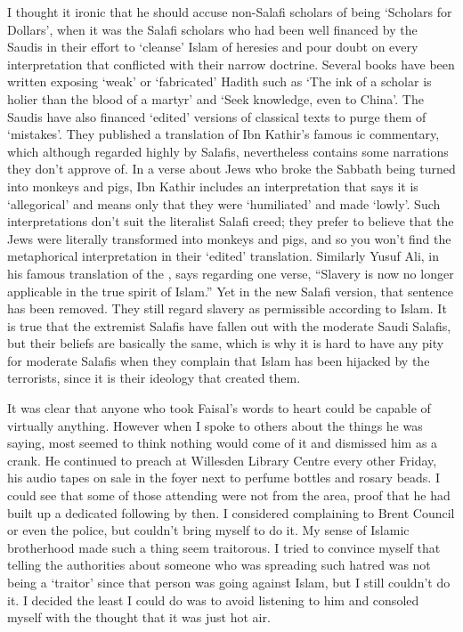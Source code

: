 \documentclass[12pt]{memoir}
\begin{document}
I thought it ironic that he should accuse non-Salafi scholars of being
‘Scholars for Dollars’, when it was the Salafi scholars
who had been well financed by the Saudis in their effort
to ‘cleanse’ Islam of heresies and pour doubt on every interpretation
that conflicted with their narrow doctrine.
Several books have been written exposing ‘weak’ or ‘fabricated’ Hadith
such as ‘The ink of a scholar is holier than the blood of a martyr’
and ‘Seek knowledge, even to China’.
The Saudis have also financed ‘edited’ versions of classical texts
to purge them of ‘mistakes’.
They published a translation of Ibn Kathir’s famous \Quran{}ic commentary,
which although regarded highly by Salafis,
nevertheless contains some narrations they don’t approve of.
In a verse about Jews who broke the Sabbath being turned into monkeys and pigs,
Ibn Kathir includes an interpretation that says it is ‘allegorical’
and means only that they were ‘humiliated’ and made ‘lowly’.
Such interpretations don’t suit the literalist Salafi creed;
they prefer to believe that the Jews were literally transformed
into monkeys and pigs, and so you won’t find
the metaphorical interpretation in their ‘edited’ translation.
Similarly Yusuf Ali, in his famous translation of the \Quran,
says regarding one verse,
“Slavery is now no longer applicable in the true spirit of Islam.”
Yet in the new Salafi version, that sentence has been removed.
They still regard slavery as permissible according to Islam.
It is true that the extremist Salafis have fallen out
with the moderate Saudi Salafis,
but their beliefs are basically the same,
which is why it is hard to have any pity for moderate Salafis
when they complain that Islam has been hijacked by the terrorists,
since it is their ideology that created them.

It was clear that anyone who took Faisal’s words to heart
could be capable of virtually anything.
However when I spoke to others about the things he was saying,
most seemed to think nothing would come of it and dismissed him as a crank.
He continued to preach at Willesden Library Centre every other Friday,
his audio tapes on sale in the foyer next to perfume bottles and rosary beads.
I could see that some of those attending were not from the area,
proof that he had built up a dedicated following by then.
I considered complaining to Brent Council or even the police,
but couldn’t bring myself to do it.
My sense of Islamic brotherhood made such a thing seem traitorous.
I tried to convince myself that telling the authorities about someone
who was spreading such hatred was not being a ‘traitor’
since that person was going against Islam, but I still couldn’t do it.
I decided the least I could do was to avoid listening to him
and consoled myself with the thought that it was just hot air.
\end{document}

